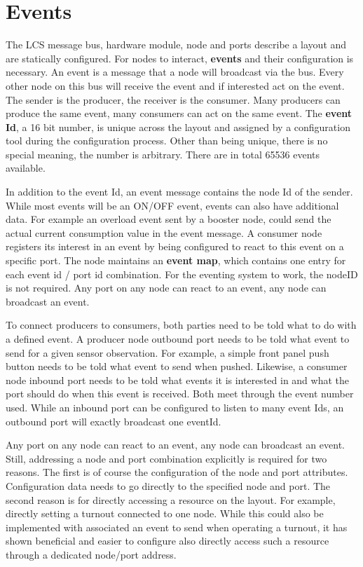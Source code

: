 \section{Events}

The LCS message bus, hardware module, node and ports describe a layout and are statically configured. For nodes to interact, {\bf events} and their configuration is necessary. An event is a message that a node will broadcast via the bus. Every other node on this bus will receive the event and if interested act on the event. The sender is the producer, the receiver is the consumer. Many producers can produce the same event, many consumers can act on the same event. The {\bf event Id}, a 16 bit number, is unique across the layout and assigned by a configuration tool during the configuration process. Other than being unique, there is no special meaning, the number is arbitrary. There are in total 65536 events available.

In addition to the event Id, an event message contains the node Id of the sender. While most events will be an ON/OFF event, events can also have additional data. For example an overload event sent by a booster node, could send the actual current consumption value in the event message. A consumer node registers its interest in an event by being configured to react to this event on a specific port. The node maintains an {\bf event map}, which contains one entry for each event id / port id combination. For the eventing system to work, the nodeID is not required. Any port on any node can react to an event, any node can broadcast an event.

To connect producers to consumers, both parties need to be told what to do with a defined event. A producer node outbound port needs to be told what event to send for a given sensor observation. For example, a simple front panel push button needs to be told what event to send when pushed. Likewise, a consumer node inbound port needs to be told what events it is interested in and what the port should do when this event is received. Both meet through the event number used. While an inbound port can be configured to listen to many event Ids, an outbound port will exactly broadcast one eventId.

Any port on any node can react to an event, any node can broadcast an event. Still, addressing a node and port combination explicitly is required for two reasons. The first is of course the configuration of the node and port attributes. Configuration data needs to go directly to the specified node and port. The second reason is for directly accessing a resource on the layout. For example, directly setting a turnout connected to one node. While this could also be implemented with associated an event to send when operating a turnout, it has shown beneficial and easier to configure also directly access such a resource through a dedicated node/port address.

